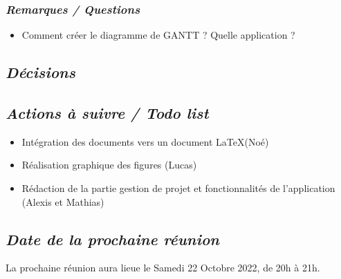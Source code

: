 \documentclass[french,a4paper]{article}
\begin{document}
\subsubsection*{\textit{Remarques / Questions}}
\begin{itemize}
  \item Comment créer le diagramme de GANTT ? Quelle application ?
\end{itemize}

\subsection*{\textit{Décisions}}


\subsection*{\textit{Actions à suivre / Todo list}}
\begin{itemize}
  \item Intégration des documents vers un document \LaTeX \space (Noé)
  \item Réalisation graphique des figures (Lucas)
  \item Rédaction de la partie gestion de projet et fonctionnalités de l'application (Alexis et Mathias)
\end{itemize}

\subsection*{\textit{Date de la prochaine réunion}}
La prochaine réunion aura lieue le Samedi 22 Octobre 2022, de 20h à 21h.
\end{document}
